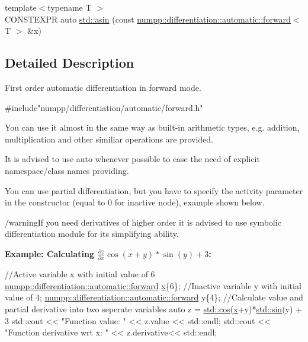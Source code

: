 \begin{DoxyCompactItemize}
\item 
{\footnotesize template$<$typename T $>$ }\\C\+O\+N\+S\+T\+E\+X\+PR auto \hyperlink{group__numpp__differentiation__forward__automatic_ga2db415f6b1d59e1f1679ff7bbf4c426b}{std\+::asin} (const \hyperlink{classnumpp_1_1differentiation_1_1automatic_1_1forward}{numpp\+::differentiation\+::automatic\+::forward}$<$ T $>$ \&x)
\end{DoxyCompactItemize}


\subsection{Detailed Description}
First order automatic differentiation in forward mode. 


\begin{DoxyCode}
\textcolor{preprocessor}{#include"numpp/differentiation/automatic/forward.h"}
\end{DoxyCode}


You can use it almost in the same way as built-\/in arithmetic types, e.\+g. addition, multiplication and other similiar operations are provided.

It is advised to use auto whenever possible to ease the need of explicit namespace/class names providing.

You can use partial differentiation, but you have to specify the activity parameter in the constructor (equal to 0 for inactive node), example shown below.

/warning\+If you need derivatives of higher order it is advised to use symbolic differentiation module for it\textquotesingle{}s simplifying ability.

{\bfseries Example\+: Calculating $ \frac{\partial z}{\partial x} \cos(x+y)*\sin(y) + 3 $\+:} 
\begin{DoxyCode}
\textcolor{comment}{//Active variable x with initial value of 6}
\hyperlink{classnumpp_1_1differentiation_1_1automatic_1_1forward}{numpp::differentiation::automatic::forward} 
      \hyperlink{group__numpp__differentiation__symbolic_gac865497d2896f51d0cab2e9c64799a15}{x}\{6\};
\textcolor{comment}{//Inactive variable y with initial value of 4;}
\hyperlink{classnumpp_1_1differentiation_1_1automatic_1_1forward}{numpp::differentiation::automatic::forward} y\{4\};
\textcolor{comment}{//Calculate value and partial derivative into two seperate variables}
\textcolor{keyword}{auto} z = \hyperlink{group__numpp__differentiation__forward__automatic_gaa5a06320f93037d94fda441546d7d690}{std::cos}(\hyperlink{group__numpp__differentiation__symbolic_gac865497d2896f51d0cab2e9c64799a15}{x}+y)*\hyperlink{group__numpp__differentiation__forward__automatic_ga6f6f07250087b18ada9ea1f84418f24f}{std::sin}(y) + 3
std::cout << \textcolor{stringliteral}{"Function value: "} << z.value << std::endl;
std::cout << \textcolor{stringliteral}{"Function derivative wrt x: "} << z.derivative<< std::endl;
\end{DoxyCode}


